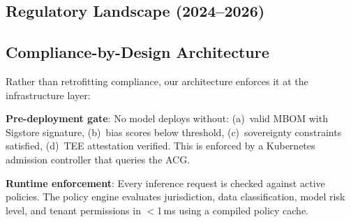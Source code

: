 \documentclass[conference,10pt]{IEEEtran}
\begin{document}
\subsection{Regulatory Landscape (2024--2026)}

\begin{table}[!htbp]
\caption{Global AI Regulatory Requirements Mapped to Technical Controls}
\label{tab:regs}
\centering\scriptsize
{}
\end{table}

\subsection{Compliance-by-Design Architecture}

Rather than retrofitting compliance, our architecture enforces it at the infrastructure layer:

\textbf{Pre-deployment gate}: No model deploys without: (a)~valid MBOM with Sigstore signature, (b)~bias scores below threshold, (c)~sovereignty constraints satisfied, (d)~TEE attestation verified. This is enforced by a Kubernetes admission controller that queries the ACG.

\textbf{Runtime enforcement}: Every inference request is checked against active policies. The policy engine evaluates jurisdiction, data classification, model risk level, and tenant permissions in $<$1\,ms using a compiled policy cache.
\end{document}
